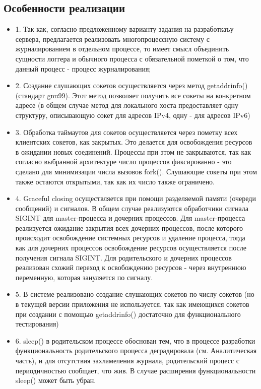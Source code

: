 \documentclass[a4paper,12pt]{report}
\begin{document}
\subsection*{Особенности реализации}
\begin{itemize}
    \item 1. Так как, согласно предложенному варианту задания на разработкаъу сервера, предлагается реализовать многопроцессную систему с журналированием в отдельном процессе, то имеет смысл объединить сущности логгера и обычного процесса с обязательной пометкой о том, что данный процесс - процесс журналирования;
    \item 2. Создание слушающих сокетов осуществляется через метод getaddrinfo() (стандарт gnu99). Этот метод позволяет получить все сокеты на конкретном адресе (в общем случае метод для локального хоста предоставляет одну структуру, описывающую сокет для адресов IPv4, одну - для адресов IPv6)
    \item 3. Обработка таймаутов для сокетов осуществляется через пометку всех клиентских сокетов, как закрытых. Это делается для освобождения ресурсов в ожидании новых соединений. Процессы при этом не закрываются, так как согласно выбранной архитектуре число процессов фиксированно - это сделано для минимизации числа вызовов fork(). Слушающие сокеты при этом также остаются открытыми, так как их число также ограничено.
    \item 4. Graceful closing  осуществляется при помощи разделяемой памяти (очереди сообщений) и сигналов. В общем случае реализуются обработчики сигнала SIGINT для master-процесса и дочерних процессов. Для master-процесса реализуется ожидание закрытия всех дочерних процессов, после которого происходит освобождение системных ресурсов и удаление процесса, тогда как для дочерних процессов освобождение ресурсов осуществляется после получения сигнала SIGINT. Для родительского и дочерних процессов реализован схожий переход к освобождению ресурсов - через внутреннюю переменную, которая зануляется по сигналу.
    \item 5. В системе реализовано создание слушающих сокетов по числу сокетов (но в текущей версии приложения не используется, так как имеющихся сокетов при создании с помощью getaddrinfo() достаточно для функционального тестирования)
    \item 6. sleep() в родительском процессе обоснован тем, что в процессе разработки функциональность родительского процесса деградировала (см. Аналитическая часть), и для отсутствия захламеления журнала, родительский процесс с периодичностью сообщает, что жив. В случае расширения функциональности sleep() может быть убран.

\end{itemize}
\end{document}
